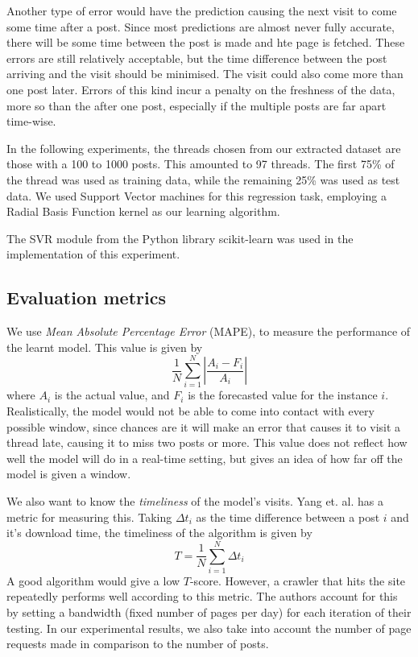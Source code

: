 \documentclass[12 pt]{article}
\begin{document}
Another type of error would have the prediction causing the next visit to come some time after a post. Since most predictions are almost never fully accurate, there will be some time between the post is made and hte page is fetched. These errors are still relatively acceptable, but the time difference between the post arriving and the visit should be minimised. The visit could also come more than one post later. Errors of this kind incur a penalty on the freshness of the data, more so than the after one post, especially if the multiple posts are far apart time-wise.


In the following experiments, the threads chosen from our extracted dataset are those with a 100 to 1000 posts. This amounted to 97 threads. The first 75\% of the thread was used as training data, while the remaining 25\% was used as test data. We used Support Vector machines for this regression task, employing a Radial Basis Function kernel as our learning algorithm. 

The SVR module from the Python library scikit-learn was used in the implementation of this experiment.



\subsection{Evaluation metrics}
We use \emph{Mean Absolute Percentage Error} (MAPE), to measure the performance of the learnt model. This value is given by
\[
	\frac{1}{N}\sum^N_{i=1}\left|\frac{A_i-F_i}{A_i}\right|
\]
where $A_i$ is the actual value, and $F_i$ is the forecasted value for the instance $i$. Realistically, the model would not be able to come into contact with every possible window, since chances are it will make an error that causes %
it to visit a thread late, causing it to miss two posts or more. This value does not reflect how well the model will do in a real-time setting, but gives an idea of how far off the model is given a window. 

We also want to know the \emph{timeliness} of the model's visits. Yang et. al. \cite{Yang2009} has a metric for measuring this. Taking $\Delta t_i$ as the time difference between a post $i$ and it's download time, the timeliness of the algorithm is given by
\[T = \frac{1}{N} \sum^{N}_{i=1}\Delta t_i\]
A good algorithm would give a low $T$-score. However, a crawler that hits the site repeatedly performs well according to this metric. The authors account for this by setting a bandwidth (fixed number of pages per day) for each iteration of their testing. In our experimental results, we also take into account the number of page requests made in comparison to the number of posts. %
\end{document}
